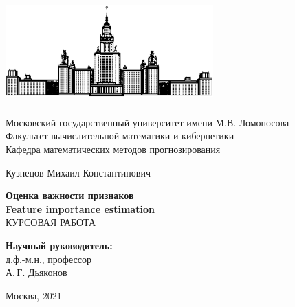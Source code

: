 \documentclass[12pt]{article}
\begin{document}
\begin{titlepage}
\begin{center}
\includegraphics[width=8cm, height=4cm]{MSU}
\end{center}
\begin{center}
Московский государственный университет имени М.В. Ломоносова\\
\vspace{0.1 cm}
Факультет вычислительной математики и кибернетики\\
\vspace{0.1 cm}
Кафедра математических методов прогнозирования

\vspace{3cm}
{\Large Кузнецов Михаил Константинович }\\
\vspace{1cm}

{\bf\LARGE Оценка важности признаков}\\ \vspace{0.5cm}
{\bf\Large Feature importance estimation}\\ 
\vspace{2cm}
КУРСОВАЯ РАБОТА

\end{center}
\vspace{2cm}
\begin{flushright}

{\bf Научный руководитель:}\\
д.ф.-м.н., профессор\\ 
А.\,Г. Дьяконов

\end{flushright}

\vspace{4.5cm}

\centerline {Москва, 2021}

\end{titlepage}

\newpage
\begin{flushleft}
\textbf{}
\end{flushleft}
\vspace{-2.2cm}
\tableofcontents
\end{document}

